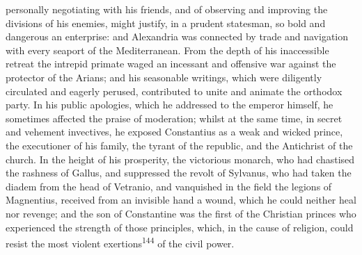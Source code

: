 personally negotiating with his friends, and of observing and
improving the divisions of his enemies, might justify, in a
prudent statesman, so bold and dangerous an enterprise: and
Alexandria was connected by trade and navigation with every
seaport of the Mediterranean. From the depth of his inaccessible
retreat the intrepid primate waged an incessant and offensive war
against the protector of the Arians; and his seasonable writings,
which were diligently circulated and eagerly perused, contributed
to unite and animate the orthodox party. In his public apologies,
which he addressed to the emperor himself, he sometimes affected
the praise of moderation; whilst at the same time, in secret and
vehement invectives, he exposed Constantius as a weak and wicked
prince, the executioner of his family, the tyrant of the
republic, and the Antichrist of the church. In the height of his
prosperity, the victorious monarch, who had chastised the
rashness of Gallus, and suppressed the revolt of Sylvanus, who
had taken the diadem from the head of Vetranio, and vanquished in
the field the legions of Magnentius, received from an invisible
hand a wound, which he could neither heal nor revenge; and the
son of Constantine was the first of the Christian princes who
experienced the strength of those principles, which, in the cause
of religion, could resist the most violent exertions\textsuperscript{144} of the
civil power.



